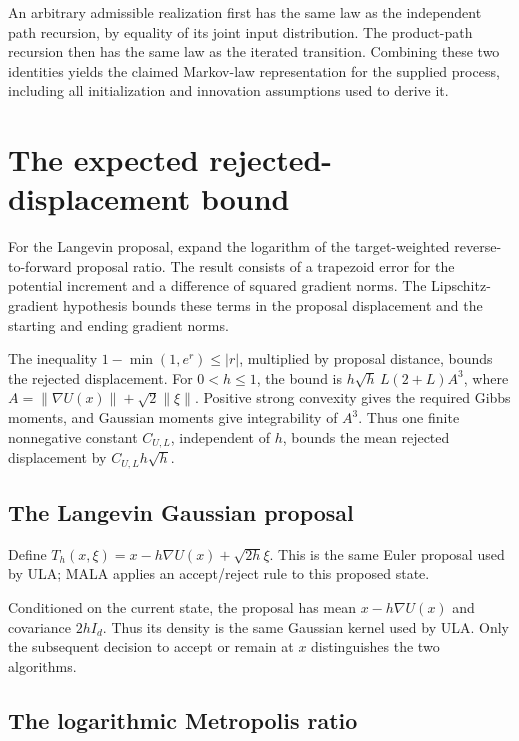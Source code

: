 \documentclass[11pt,a4paper]{article}
\begin{document}
An arbitrary admissible realization first has the same law as the independent path recursion, by equality of its joint input distribution. The product-path recursion then has the same law as the iterated transition. Combining these two identities yields the claimed Markov-law representation for the supplied process, including all initialization and innovation assumptions used to derive it.


\section{\texorpdfstring{The expected rejected-displacement bound}{The expected rejected-displacement bound}}


For the Langevin proposal, expand the logarithm of the target-weighted reverse-to-forward proposal ratio. The result consists of a trapezoid error for the potential increment and a difference of squared gradient norms. The Lipschitz-gradient hypothesis bounds these terms in the proposal displacement and the starting and ending gradient norms.



The inequality \(1-\min(1,e^r)\le|r|\), multiplied by proposal distance, bounds the rejected displacement. For \(0<h\le1\), the bound is \(h\sqrt h\,L(2+L)A^3\), where \(A=\|\nabla U(x)\|+\sqrt2\|\xi\|\). Positive strong convexity gives the required Gibbs moments, and Gaussian moments give integrability of \(A^3\). Thus one finite nonnegative constant \(C_{U,L}\), independent of \(h\), bounds the mean rejected displacement by \(C_{U,L}h\sqrt h\).


\subsection{\texorpdfstring{The Langevin Gaussian proposal}{The Langevin Gaussian proposal}}


Define \(T_h(x,\xi)=x-h\nabla U(x)+\sqrt{2h}\xi\). This is the same Euler proposal used by ULA; MALA applies an accept/\allowbreak{}reject rule to this proposed state.



Conditioned on the current state, the proposal has mean \(x-h\nabla U(x)\) and covariance \(2hI_d\). Thus its density is the same Gaussian kernel used by ULA. Only the subsequent decision to accept or remain at \(x\) distinguishes the two algorithms.


\subsection{\texorpdfstring{The logarithmic Metropolis ratio}{The logarithmic Metropolis ratio}}
\end{document}
